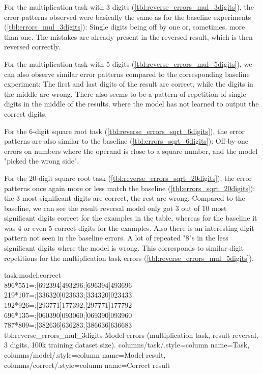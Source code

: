 For the multiplication task with 3 digits (\cref{tbl:reverse_errors_mul_3digits}), the error patterns observed were basically the same as for the baseline experiments  (\cref{tbl:errors_mul_3digits}): Single digits being off by one or, sometimes, more than one.
The mistakes are already present in the reversed result,
which is then reversed correctly.

For the multiplication task with 5 digits (\cref{tbl:reverse_errors_mul_5digits}), we can also observe similar error patterns compared to the corresponding baseline experiment: The first and last digits of the result are correct, while the digits in the middle are wrong.
There also seems to be a pattern of repetition of single digits in the middle of the results, where the model has not learned to output the correct digits.

For the 6-digit square root task (\cref{tbl:reverse_errors_sqrt_6digits}), the error patterns are also similar to the baseline (\cref{tbl:errors_sqrt_6digits}): Off-by-one errors on numbers where the operand is close to a square number, and the model "picked the wrong side".

For the 20-digit square root task (\cref{tbl:reverse_errors_sqrt_20digits}), the error patterns once again more or less match the baseline (\cref{tbl:errors_sqrt_20digits}): the 3 most significant digits are correct, the rest are wrong.
Compared to the baseline, we can see the result reversal model only got 3 out of 10 most significant digits correct for the examples in the table, whereas for the baseline it was 4 or even 5 correct digits for the examples.
Also there is an interesting digit pattern not seen in the baseline errors. A lot of repeated "8"s in the less significant digits where the model is wrong. This corresponds to similar digit repetitions for the multiplication task errors (\cref{tbl:reverse_errors_mul_5digits}).



{
	task;model;correct\\
	896*551=;[692394]493296;[696394]493696\\
	219*107=;[336320]023633;[334320]023433\\
	192*926=;[293771]177392;[297771]177792\\
	696*135=;[060390]093060;[069390]093960\\
	787*809=;[382636]636283;[386636]636683\\
}
{tbl:reverse_errors_mul_3digits}
{
	Model errors (multiplication task, result reversal, 3 digits, 100k training dataset size).
}
{
	columns/task/.style={column name={Task}},
	columns/model/.style={column name={Model result}},
	columns/correct/.style={column name={Correct result}}
}

